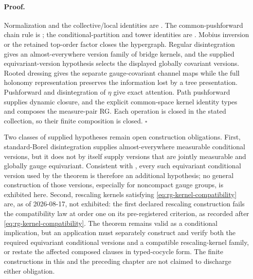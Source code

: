 \paragraph{Proof.}
Normalization and the collective/local identities are
.
The common-pushforward chain rule is ; the
conditional-partition and tower identities are .
Mobius inversion or the retained top-order factor closes the hypergraph.
Regular disintegration gives an almost-everywhere version family of bridge
kernels, and the supplied equivariant-version hypothesis selects the displayed
globally covariant versions.  Rooted dressing gives the
separate gauge-covariant channel maps while the full holonomy representation
preserves the information lost by a tree presentation.  Pushforward and
disintegration of $\eta$ give exact attention.  Path pushforward supplies
dynamic closure, and the explicit common-space kernel identity types and
composes the measure-pair RG.  Each operation is closed in the stated
collection, so their finite composition is closed.  $\square$

Two classes of supplied hypotheses remain open construction obligations.  First,
standard-Borel disintegration supplies almost-everywhere measurable conditional
versions, but it does not by itself supply versions that are jointly measurable
and globally gauge equivariant.  Consistent with
, every such equivariant conditional version used by
the theorem is therefore an additional hypothesis; no general construction of
those versions, especially for noncompact gauge groups, is exhibited here.
Second, rescaling kernels satisfying \eqref{eq:rg-kernel-compatibility} are, as
of 2026-08-17, not exhibited: the first declared rescaling construction fails
the compatibility law at order one on its pre-registered criterion, as
recorded after \eqref{eq:rg-kernel-compatibility}.  The theorem remains valid
as a conditional implication, but an application must separately construct
and verify both the required equivariant conditional versions and a compatible
rescaling-kernel family, or restate the affected composed clauses in
typed-cocycle form.  The finite constructions in this and the preceding
chapter are not claimed to discharge either obligation.  

